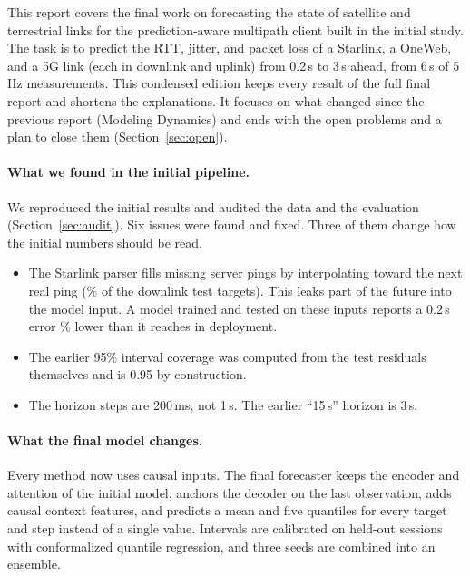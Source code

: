 This report covers the final work on forecasting the state of satellite and terrestrial links for the prediction-aware multipath client built in the initial study. The task is to predict the RTT, jitter, and packet loss of a Starlink, a OneWeb, and a 5G link (each in downlink and uplink) from 0.2\,s to 3\,s ahead, from 6\,s of 5\,Hz measurements. This condensed edition keeps every result of the full final report and shortens the explanations. It focuses on what changed since the previous report (Modeling Dynamics) and ends with the open problems and a plan to close them (Section~\ref{sec:open}).

\paragraph{What we found in the initial pipeline.} We reproduced the initial results and audited the data and the evaluation (Section~\ref{sec:audit}). Six issues were found and fixed. Three of them change how the initial numbers should be read.
\begin{itemize}[leftmargin=*]
  \item The Starlink parser fills missing server pings by interpolating toward the next real ping (\InterpFracSLDL\% of the downlink test targets). This leaks part of the future into the model input. A model trained and tested on these inputs reports a 0.2\,s error \LeakOptDSMAEhOne\% lower than it reaches in deployment.
  \item The earlier 95\% interval coverage was computed from the test residuals themselves and is 0.95 by construction.
  \item The horizon steps are 200\,ms, not 1\,s. The earlier ``15\,s'' horizon is 3\,s.
\end{itemize}

\paragraph{What the final model changes.} Every method now uses causal inputs. The final forecaster keeps the encoder and attention of the initial model, anchors the decoder on the last observation, adds causal context features, and predicts a mean and five quantiles for every target and step instead of a single value. Intervals are calibrated on held-out sessions with conformalized quantile regression, and three seeds are combined into an ensemble.

